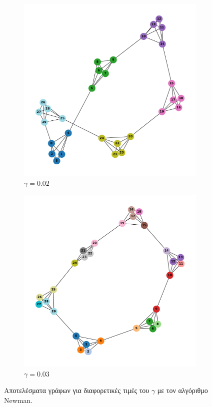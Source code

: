 \documentclass[10pt, letterpaper]{article}
\begin{document}
\begin{figure}[H]
  \vfill

  \begin{subfigure}{0.5\textwidth}
    \centering
    \includegraphics[width=0.8\linewidth]{gammachange6,5gamma=0.02.pdf}
    \caption{$\gamma = 0.02$}
    \label{g3}
  \end{subfigure}
  \begin{subfigure}{0.5\textwidth}
    \centering
    \includegraphics[width=0.8\linewidth]{gammachange6,5gamma=0.04.pdf}
    \caption{$\gamma = 0.03$}
    \label{g4}
  \end{subfigure}


  \caption{Αποτελέσματα γράφων για διαφορετικές τιμές του $\gamma$
  με τον αλγόριθμο \textlatin{Newman}.}
  \label{gamma_tests}
\end{figure}
\end{document}
